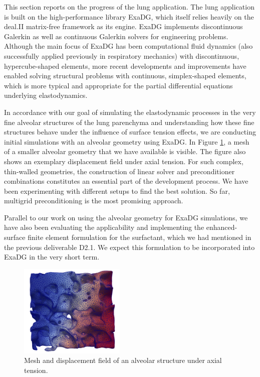 \documentclass[a4paper,12pt]{article}
\begin{document}
This section reports on the progress of the lung application. The lung application is built on the high-performance library ExaDG, which itself relies heavily on the deal.II matrix-free framework as its engine. ExaDG implements discontinuous Galerkin as well as continuous Galerkin solvers for engineering problems. Although the main focus of ExaDG has been computational fluid dynamics (also successfully applied previously in respiratory mechanics) with discontinuous, hypercube-shaped elements, more recent developments and improvements \citep{schussnig2025matrixfree} have enabled solving structural problems with continuous, simplex-shaped elements, which is more typical and appropriate for the partial differential equations underlying elastodynamics.

In accordance with our goal of simulating the elastodynamic processes in the very fine alveolar structures of the lung parenchyma and understanding how these fine structures behave under the influence of surface tension effects, we are conducting initial simulations with an alveolar geometry using ExaDG. In Figure \ref{fig:alveolar-structure}, a mesh of a smaller alveolar geometry that we have available is visible. The figure also shows an exemplary displacement field under axial tension. For such complex, thin-walled geometries, the construction of linear solver and preconditioner combinations constitutes an essential part of the development process. We have been experimenting with different setups to find the best solution. So far, multigrid preconditioning is the most promising approach.

Parallel to our work on using the alveolar geometry for ExaDG simulations, we have also been evaluating the applicability and implementing the enhanced-surface finite element formulation for the surfactant, which we had mentioned in the previous deliverable D2.1. We expect this formulation to be incorporated into ExaDG in the very short term.

\begin{figure}
  \centering

  \includegraphics[width=0.45\textwidth]{tum-alveolar-structure.png}

  \caption{Mesh and displacement field of an alveolar structure under axial tension.}
  \label{fig:alveolar-structure}
\end{figure}
\end{document}
